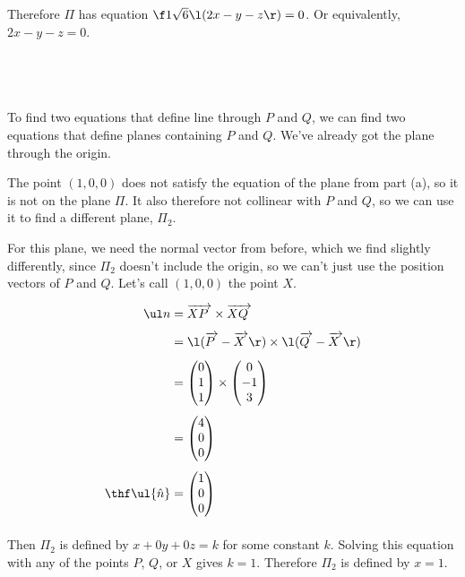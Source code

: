 \documentclass[a4paper]{article}
\begin{document}
Therefore $\Pi$ has equation $\f1{\sqrt6} \l( 2x - y - z \r) = 0$. Or equivalently, $2x - y - z = 0$.

\subsection{~}

To find two equations that define line through $P$ and $Q$, we can find two equations that define planes containing $P$ and $Q$. We've already got the plane through the origin.

The point $(1, 0, 0)$ does not satisfy the equation of the plane from part (a), so it is not on the plane $\Pi$. It also therefore not collinear with $P$ and $Q$, so we can use it to find a different plane, $\Pi_2$.

For this plane, we need the normal vector from before, which we find slightly differently, since $\Pi_2$ doesn't include the origin, so we can't just use the position vectors of $P$ and $Q$. Let's call $(1, 0, 0)$ the point $X$.

\begin{align*}
\ul n &= \overrightarrow{XP\;} \times \overrightarrow{XQ\;}\\[1ex]
&= \l(\overrightarrow{P\;} - \overrightarrow{X\;}\r) \times \l(\overrightarrow{Q\;} - \overrightarrow{X\;}\r)\\[1ex]
&= \begin{pmatrix}0\\ 1\\ 1\end{pmatrix} \times \begin{pmatrix}0\\ -1\\ 3\end{pmatrix}\\[1ex]
&= \begin{pmatrix}4\\ 0\\ 0\end{pmatrix}\\[1ex]
\thf \ul{\hat n} &= \begin{pmatrix}1\\ 0\\ 0\end{pmatrix}\\[1ex]
\end{align*}

Then $\Pi_2$ is defined by $x + 0y + 0z = k$ for some constant $k$. Solving this equation with any of the points $P$, $Q$, or $X$ gives $k=1$. Therefore $\Pi_2$ is defined by $x=1$.
\end{document}
